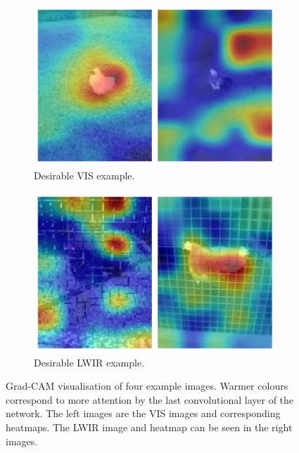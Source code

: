 \documentclass{l4proj}
\begin{document}
\begin{figure}[ht]
  \begin{subfigure}[h!]{0.45\textwidth}
    \includegraphics[width=\textwidth]{images/evaluation/grad_cam/vis}
    \caption{Desirable VIS example.}
    \label{fig:grad_cam_vis}
  \end{subfigure}
  \quad
  \begin{subfigure}[h!]{0.45\textwidth}
    \includegraphics[width=\textwidth]{images/evaluation/grad_cam/lwir}
    \caption{Desirable LWIR example.}
    \label{fig:grad_cam_lwir}
  \end{subfigure}
  \caption{Grad-CAM visualisation of four example images. Warmer colours correspond to more attention by the last convolutional layer of the network. The left images are the VIS images and corresponding heatmaps. The LWIR image and heatmap can be seen in the right images.}
  \label{fig:grad_cam}
\end{figure}
\end{document}
